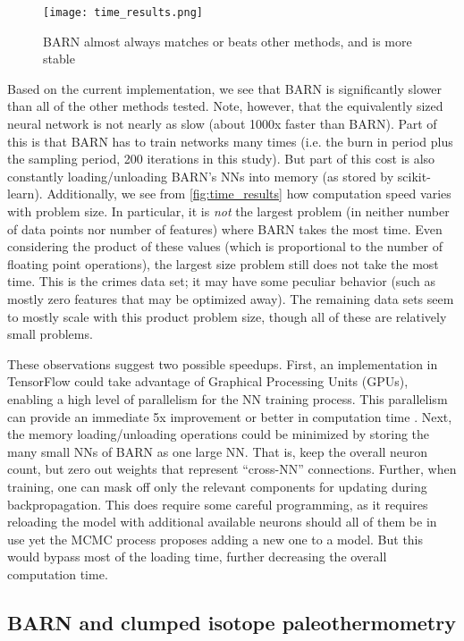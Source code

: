 \documentclass[12pt]{article}
\begin{document}
\begin{figure}[ht]
\centering
    \texttt{[image: time\_results.png]}
    \caption{BARN almost always matches or beats other methods, and is more stable}
    \label{fig:time_results}
\end{figure}

Based on the current implementation, we see that BARN is significantly slower than all of the other methods tested.  Note, however, that the equivalently sized neural network is not nearly as slow (about 1000x faster than BARN).  Part of this is that BARN has to train networks many times (i.e. the burn in period plus the sampling period, 200 iterations in this study).  But part of this cost is also constantly loading/unloading BARN's NNs into memory (as stored by scikit-learn).  Additionally, we see from \autoref{fig:time_results} how computation speed varies with problem size.  In particular, it is \emph{not} the largest problem (in neither number of data points nor number of features) where BARN takes the most time.  Even considering the product of these values (which is proportional to the number of floating point operations), the largest size problem still does not take the most time.  This is the crimes data set; it may have some peculiar behavior (such as mostly zero features that may be optimized away).  The remaining data sets seem to mostly scale with this product problem size, though all of these are relatively small problems.

These observations suggest two possible speedups.  First, an implementation in TensorFlow could take advantage of Graphical Processing Units (GPUs), enabling a high level of parallelism for the NN training process.  This parallelism can provide an immediate 5x improvement or better in computation time \cite{lind2019performance}.  Next, the memory loading/unloading operations could be minimized by storing the many small NNs of BARN as one large NN.  That is, keep the overall neuron count, but zero out weights that represent ``cross-NN'' connections.  Further, when training, one can mask off only the relevant components for updating during backpropagation.  This does require some careful programming, as it requires reloading the model with additional available neurons should all of them be in use yet the MCMC process proposes adding a new one to a model.  But this would bypass most of the loading time, further decreasing the overall computation time.

\subsection{BARN and clumped isotope paleothermometry}\label{subsec:therm}
\end{document}

